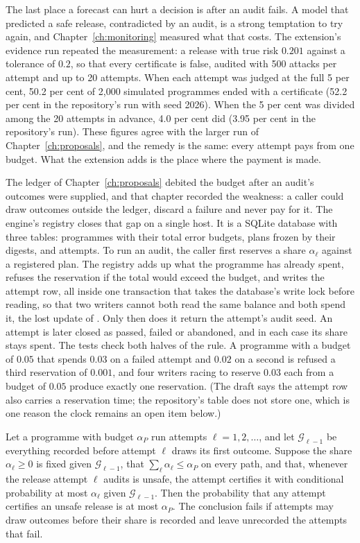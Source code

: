 The last place a forecast can hurt a decision is after an audit fails. A model that predicted a
safe release, contradicted by an audit, is a strong temptation to try again, and
Chapter~\ref{ch:monitoring} measured what that costs. The extension's evidence run repeated the measurement: a
release with true risk $0.201$ against a tolerance of $0.2$, so that every certificate is false,
audited with 500 attacks per attempt and up to 20 attempts. When each attempt was judged at the
full 5 per cent, 50.2 per cent of 2,000 simulated programmes ended with a certificate (52.2 per
cent in the repository's run with seed 2026). When the 5 per cent was divided among the 20 attempts in advance, 4.0 per cent did
(3.95 per cent in the repository's run). These figures agree with the larger run of Chapter~\ref{ch:proposals}, and the remedy is the
same: every attempt pays from one budget. What the extension adds is the place where the payment is
made.

The ledger of Chapter~\ref{ch:proposals} debited the budget after an audit's outcomes were supplied, and that chapter
recorded the weakness: a caller could draw outcomes outside the ledger, discard a failure and never
pay for it. The engine's registry closes that gap on a single host. It is a SQLite database with
three tables: programmes with their total error budgets, plans frozen by their digests, and
attempts. To run an audit, the caller first reserves a share $\alpha_\ell$ against a registered plan.
The registry adds up what the programme has already spent, refuses the reservation if the total
would exceed the budget, and writes the attempt row, all inside one transaction that takes the
database's write lock before reading, so that two writers cannot both read the same balance and
both spend it, the lost update of \citet{berenson1995}. Only then does it return the attempt's audit
seed. An attempt is later closed as passed, failed or abandoned, and in each case its share stays
spent. The tests check both halves of the rule. A programme with a budget of $0.05$ that spends $0.03$
on a failed attempt and $0.02$ on a second is refused a third reservation of $0.001$, and four writers
racing to reserve $0.03$ each from a budget of $0.05$ produce exactly one reservation. (The draft says
the attempt row also carries a reservation time; the repository's table does not store one, which
is one reason the clock remains an open item below.)

\begin{proposition}\label{c22:prop-spend}
Let a programme with budget $\alpha_P$ run attempts $\ell=1,2,\dots$, and let $\mathcal G_{\ell-1}$ be everything recorded before
attempt $\ell$ draws its first outcome. Suppose the share $\alpha_\ell\ge0$ is fixed given $\mathcal G_{\ell-1}$, that $\sum_\ell\alpha_\ell\le\alpha_P$ on every
path, and that, whenever the release attempt $\ell$ audits is unsafe, the attempt certifies it with conditional probability at
most $\alpha_\ell$ given $\mathcal G_{\ell-1}$. Then the probability that any attempt certifies an unsafe release is at most
$\alpha_P$. The conclusion fails if attempts may draw outcomes before their share is recorded and leave
unrecorded the attempts that fail.
\end{proposition}

